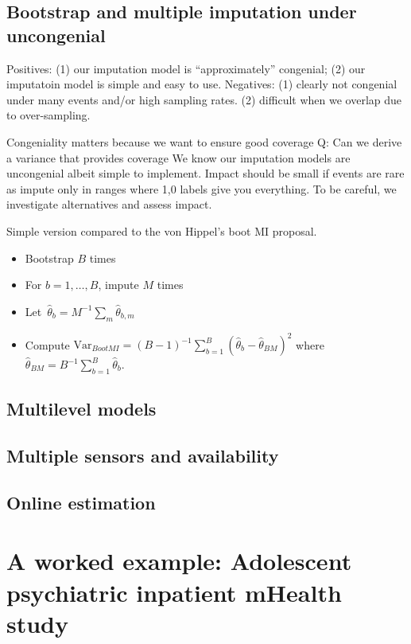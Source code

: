\documentclass[11pt]{amsart}
\begin{document}
\subsection{Bootstrap and multiple imputation under uncongenial }

Positives: (1) our imputation model is ``approximately'' congenial; (2) our imputatoin model is simple and easy to use.
Negatives: (1) clearly not congenial under many events and/or high sampling rates. (2) difficult when we overlap due to over-sampling.

Congeniality matters because we want to ensure good coverage
Q: Can we derive a variance that provides coverage
We know our imputation models are uncongenial albeit simple to implement.  Impact should be small if events are rare as impute only in ranges where 1,0 labels give you everything.  To be careful, we investigate alternatives and assess impact.

Simple version compared to the von Hippel's boot MI proposal.
\begin{itemize}
\item Bootstrap $B$ times
\item For $b = 1, \ldots, B$, impute $M$ times
\item Let~$\hat \theta_b = M^{-1} \sum_m \hat \theta_{b,m}$
\item Compute $\text{Var}_{BootMI} = (B-1)^{-1} \sum_{b=1}^B (\hat \theta_b - \hat \theta_{BM})^2$ where $\hat \theta_{BM} = B^{-1} \sum_{b=1}^B \hat \theta_b$.
\end{itemize}


\newpage

\subsection{Multilevel models}

\subsection{Multiple sensors and availability}

\subsection{Online estimation}

\section{A worked example: Adolescent psychiatric inpatient mHealth study} \label{section:example}
\end{document}
